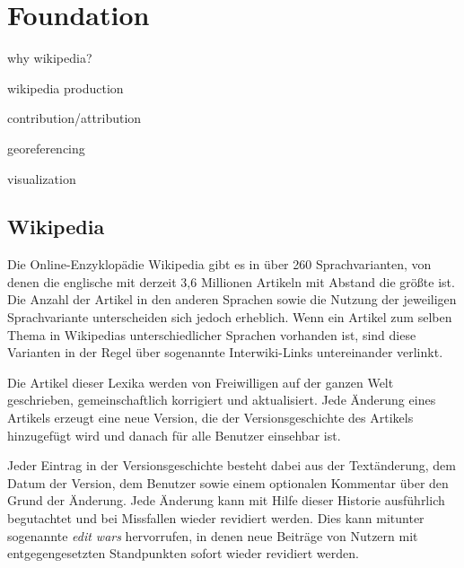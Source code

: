 \chapter{Foundation}\label{ch:foundation}

\begin{todos}
    \item {}
    \item why wikipedia?
    \item wikipedia production
    \item contribution/attribution
    \item georeferencing
    \item visualization
\end{todos}

\section{Wikipedia}


Die Online-Enzyklopädie Wikipedia gibt es in über 260 Sprachvarianten, von denen die englische mit derzeit 3,6 Millionen Artikeln mit Abstand die größte ist.
Die Anzahl der Artikel in den anderen Sprachen sowie die Nutzung der jeweiligen Sprachvariante unterscheiden sich jedoch erheblich.\cite{wikistats}
Wenn ein Artikel zum selben Thema in Wikipedias unterschiedlicher Sprachen vorhanden ist, sind diese Varianten in der Regel über sogenannte Interwiki-Links untereinander verlinkt.


Die Artikel dieser Lexika werden von Freiwilligen auf der ganzen Welt geschrieben, gemeinschaftlich korrigiert und aktualisiert.
Jede Änderung eines Artikels erzeugt eine neue Version, die der Versionsgeschichte des Artikels hinzugefügt wird und danach für alle Benutzer einsehbar ist.


Jeder Eintrag in der Versionsgeschichte besteht dabei aus der Textänderung, dem Datum der Version, dem Benutzer sowie einem optionalen Kommentar über den Grund der Änderung.
Jede Änderung kann mit Hilfe dieser Historie ausführlich begutachtet und bei Missfallen wieder revidiert werden. 
Dies kann mitunter sogenannte \emph{edit wars} hervorrufen, in denen neue Beiträge von Nutzern mit entgegengesetzten Standpunkten sofort wieder revidiert werden.\cite{suh2007us} 

